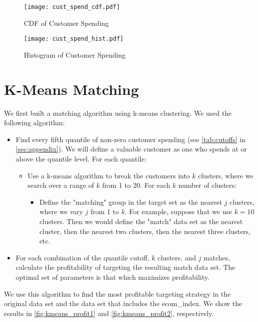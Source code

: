 \begin{figure}[!htb]
  \centering
  \caption{CDF of Customer Spending}
  \texttt{[image: cust\_spend\_cdf.pdf]}
  \label{fig:cust_spend_cdf}
\end{figure}

\begin{figure}[!htb]
  \centering
  \caption{Histogram of Customer Spending}
  \texttt{[image: cust\_spend\_hist.pdf]}
  \label{fig:cust_spend_hist}
\end{figure}


\section{K-Means Matching}

We first built a matching algorithm using k-means clustering. We used the following algorithm:
\begin{itemize}
\item Find every fifth quantile of non-zero customer spending (see \cref{tab:cutoffs} in \vref{sec:appendix}). We will define a valuable customer as one who spends at or above the quantile level. For each quantile:
\begin{itemize}
\item Use a k-means algorithm to break the customers into $k$ clusters, where we search over a range of $k$ from 1 to 20. For each $k$ number of clusters:
\begin{itemize}
\item Define the "matching" group in the target set as the nearest $j$ clusters, where we vary $j$ from 1 to $k$. For example, suppose that we use $k=10$ clusters. Then we would define the "match" data set as the nearest cluster, then the nearest two clusters, then the nearest three clusters, etc.
\end{itemize}
\end{itemize}
\item For each combination of the quantile cutoff, $k$ clusters, and $j$ matches, calculate the profitability of targeting the resulting match data set. The optimal set of parameters is that which maximizes profitability.
\end{itemize}
We use this algorithm to find the most profitable targeting strategy in the original data set and the data set that includes the ecom\_index. We show the results in \cref{fig:kmeans_profit1} and \cref{fig:kmeans_profit2}, respectively.

